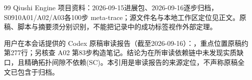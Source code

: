 \documentclass[UTF8,a4paper,11pt,fontset=fandol]{ctexart}
\numberwithin{equation}{section}
\theoremstyle{definition}
\begin{document}
\begin{thebibliography}{99}
 Qiushi Engine 项目资料：2026-09-15进展包、2026-09-16逐步归档，S0910A01/A02/A03各100步 meta-trace；源文件名与本地工作区定位见正文。原稿、脚本与摘要须分别识别，不能把记录中的成功标签视作外部定理。

 用户在本会话提供的 Codex 原稿审读报告（截至2026-09-16）：，重点位置原稿约第277行；另核查 A02 第83步构造笔记。结论为在所审读依赖链中未发现实质缺口，且精确拓扑间隙不依赖(SC)。本引用是审读报告的来源定位，不声称原稿全文已包含于归档。

\end{thebibliography}
\end{document}

